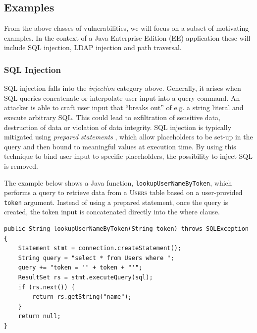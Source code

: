 \documentclass[a4paper,openany,12pt]{book}
\begin{document}
\subsection{Examples}

From the above classes of vulnerabilities, we will focus on a subset of motivating examples.
In the context of a Java Enterprise Edition (EE) application these will include SQL injection, LDAP injection and
path traversal.

\subsubsection{SQL Injection}
\label{ex:sqli}

SQL injection falls into the \emph{injection} category above.
Generally, it arises when SQL queries concatenate or interpolate user input into a query command.
An attacker is able to craft user input that ``breaks out'' of e.g. a string literal and execute arbitrary SQL.
This could lead to exfiltration of sensitive data, destruction of data or violation of data integrity.
SQL injection is typically mitigated using \emph{prepared statements} \citep{stuttard2011web}, which allow placeholders to be set-up in the
query and then bound to meaningful values at execution time.
By using this technique to bind user input to specific placeholders, the possibility to inject SQL is removed.

The example below shows a Java function, \texttt{lookupUserNameByToken}, which performs a query to retrieve data from
a \textsc{Users} table based on a user-provided \texttt{token} argument.
Instead of using a prepared statement, once the query is created, the token input is concatenated directly into the
\textcolor{id7-aubergine}{where} clause.

\newsavebox\myv

\begin{lrbox}{\myv}\begin{minipage}{\textwidth}
\begin{verbatim}
public String lookupUserNameByToken(String token) throws SQLException {
    Statement stmt = connection.createStatement();
    String query = "select * from Users where ";
    query += "token = '" + token + "'";
    ResultSet rs = stmt.executeQuery(sql);
    if (rs.next()) {
        return rs.getString("name");
    }
    return null;
}
\end{verbatim}
\end{minipage}\end{lrbox}
\end{document}
